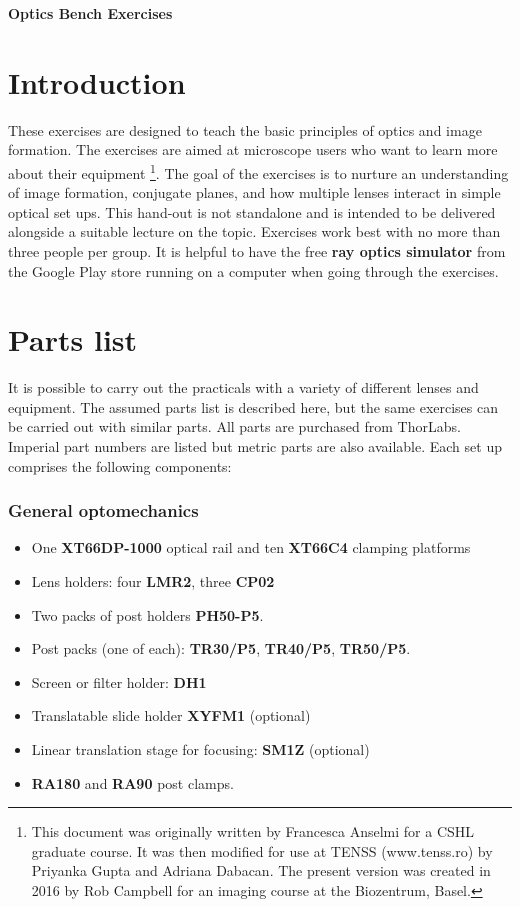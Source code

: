 \documentclass[a4paper]{report}
\begin{document}
\setcounter{secnumdepth}{2}

\begin{center}
\textbf{\Large{Optics Bench Exercises}}
\end{center}

\section{Introduction}
These exercises are designed to teach the basic principles of optics and image formation.
The exercises are aimed at microscope users who want to learn more about their equipment
\footnote{This document was originally written by Francesca Anselmi for a CSHL graduate course.
It was then modified for use at TENSS (www.tenss.ro) by Priyanka Gupta and Adriana Dabacan. 
The present version was created in 2016 by Rob Campbell for an imaging course at the Biozentrum, Basel.}.
The goal of the exercises is to nurture an understanding of image formation, conjugate planes, and how multiple lenses interact in simple optical set ups. 
This hand-out is not standalone and is intended to be delivered alongside a suitable lecture on the topic.
Exercises work best with no more than three people per group.
It is helpful to have the free \textbf{ray optics simulator} from the Google Play store running on a computer when going through the exercises. 

\section{Parts list}
It is possible to carry out the practicals with a variety of different lenses and equipment. 
The assumed parts list is described here, but the same exercises can be carried out with similar parts. 
All parts are purchased from ThorLabs.
Imperial part numbers are listed but metric parts are also available. 
Each set up comprises the following components:


\subsubsection{General optomechanics}
\begin{itemize}
\item One \textbf{XT66DP-1000} optical rail and ten \textbf{XT66C4} clamping platforms
\item Lens holders: four \textbf{LMR2}, three \textbf{CP02}
\item Two packs of post holders \textbf{PH50-P5}.
\item Post packs (one of each): \textbf{TR30/P5}, \textbf{TR40/P5}, \textbf{TR50/P5}.
\item Screen or filter holder: \textbf{DH1}
\item Translatable slide holder \textbf{XYFM1} (optional)
\item Linear translation stage for focusing: \textbf{SM1Z} (optional)
\item \textbf{RA180} and \textbf{RA90} post clamps.
\end{itemize}
\end{document}
